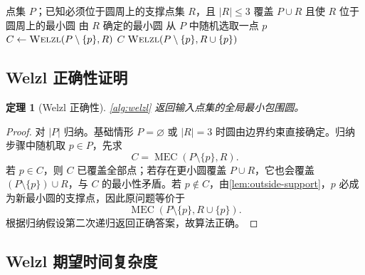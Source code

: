 \documentclass[UTF8,12pt,a4paper]{ctexart}
\newtheorem{theorem}{定理}[section]
\theoremstyle{definition}
\DeclareMathOperator{\MEC}{MEC}
\begin{document}
\begin{algorithm}[htbp]
\caption{Welzl 随机增量最小包围圆}
\label{alg:welzl}
\begin{algorithmic}[1]
\Require 点集 $P$；已知必须位于圆周上的支撑点集 $R$，且 $|R|\le3$
\Ensure 覆盖 $P\cup R$ 且使 $R$ 位于圆周上的最小圆
        \State \Return 由 $R$ 确定的最小圆
    \EndIf
    \State 从 $P$ 中随机选取一点 $p$
    \State $C\gets\Call{Welzl}{P\setminus\{p\},R}$
        \State \Return $C$
    \Else
        \State \Return $\Call{Welzl}{P\setminus\{p\},R\cup\{p\}}$
    \EndIf
\EndFunction
\end{algorithmic}
\end{algorithm}

\subsection{Welzl 正确性证明}

\begin{theorem}[Welzl 正确性]
\cref{alg:welzl} 返回输入点集的全局最小包围圆。
\end{theorem}
\begin{proof}
对 $|P|$ 归纳。基础情形 $P=\varnothing$ 或 $|R|=3$ 时圆由边界约束直接确定。归纳步骤中随机取 $p\in P$，先求
\[
C=\MEC(P\setminus\{p\},R).
\]
若 $p\in C$，则 $C$ 已覆盖全部点；若存在更小圆覆盖 $P\cup R$，它也会覆盖 $(P\setminus\{p\})\cup R$，与 $C$ 的最小性矛盾。若 $p\notin C$，由\cref{lem:outside-support}，$p$ 必成为新最小圆的支撑点，因此原问题等价于
\[
\MEC(P\setminus\{p\},R\cup\{p\}).
\]
根据归纳假设第二次递归返回正确答案，故算法正确。
\end{proof}

\subsection{Welzl 期望时间复杂度}
\end{document}
